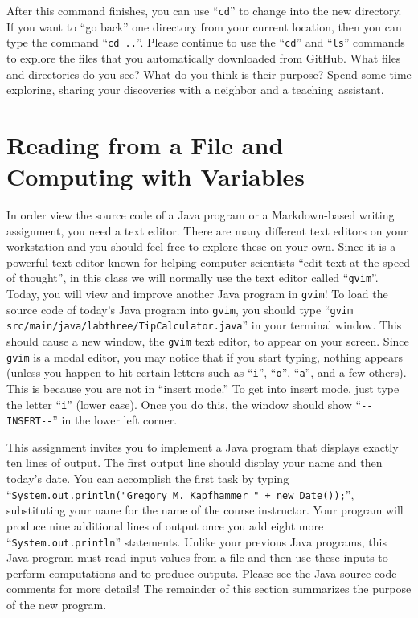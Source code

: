 \documentclass[11pt]{article}
\newcommand{\command}[1]{``\lstinline{#1}''}
\newcommand{\program}[1]{\lstinline{#1}}
\newcommand{\step}[1]{``{#1}''}
\begin{document}
After this command finishes, you can use \command{cd} to change into the new directory. If you want to \step{go back}
one directory from your current location, then you can type the command \command{cd ..}. Please continue to use the
\command{cd} and \command{ls} commands to explore the files that you automatically downloaded from GitHub. What files
and directories do you see? What do you think is their purpose? Spend some time exploring, sharing your discoveries with
a neighbor and a \mbox{teaching assistant}.

\section*{Reading from a File and Computing with Variables}

In order view the source code of a Java program or a Markdown-based writing assignment, you need a text editor. There
are many different text editors on your workstation and you should feel free to explore these on your own. Since it is a
powerful text editor known for helping computer scientists ``edit text at the speed of thought'', in this class we will
normally use the text editor called \command{gvim}. Today, you will view and improve another Java program in {\tt gvim}!
To load the source code of today's Java program into \program{gvim}, you should type \command{gvim
src/main/java/labthree/TipCalculator.java} in your terminal window. This should cause a new window, the \program{gvim}
text editor, to appear on your screen. Since \program{gvim} is a modal editor, you may notice that if you start typing,
nothing appears (unless you happen to hit certain letters such as \command{i}, \command{o}, \command{a}, and a few
others). This is because you are not in ``insert mode.'' To get into insert mode, just type the letter \command{i}
(lower case). Once you do this, the window should show \command{--INSERT--} in the lower left corner.

This assignment invites you to implement a Java program that displays exactly ten lines of output. The first
output line should display your name and then today's date. You can accomplish the first task by typing
\command{System.out.println("Gregory M. Kapfhammer " + new Date());}, substituting your name for the name of the course
instructor. Your program will produce nine additional lines of output once you add eight more
\command{System.out.println} statements. Unlike your previous Java programs, this Java program must read input values
from a file and then use these inputs to perform computations and to produce outputs. Please see the Java source code
comments for more details! The remainder of this section summarizes the purpose of the new program.
\end{document}
